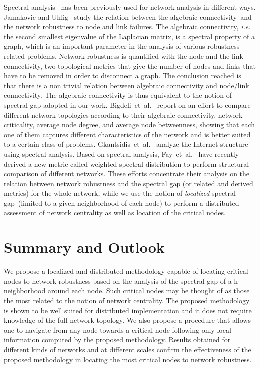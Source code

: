 \documentclass[conference,fleqn]{IEEEtran}
\begin{document}
Spectral analysis~\cite{Chung1997} has been previously used for network analysis in different ways.
Jamakovic and Uhlig~\cite{Jamakovic2007a} study the relation between the algebraic connectivity~\cite{Fiedler1973}and the network robustness to node and link failures.
The algebraic connectivity, \textit{i.e.} the second smallest eigenvalue of the Laplacian 
matrix, is a spectral property of a graph, which is an important parameter in the analysis of various robustness-related problems. Network robustness is quantified with the node and the link connectivity, two topological metrics that give the number of nodes and links 
that have to be removed in order to disconnect a graph.
The conclusion reached is that there is a non trivial relation between algebraic connectivity and node/link connectivity.
The algebraic connectivity is thus equivalent to the notion of spectral gap adopted in our work. Bigdeli~et~al.~\cite{Bigdeli2009} report on an effort to compare different network topologies according to their algebraic connectivity, network 
criticality, average node degree, and average node betweenness, showing that each one of them captures different characteristics of the 
network and is better suited to a certain class of problems. Gkantsidis~et~al.~\cite{Gkantsidis2003} analyze
the Internet structure using spectral analysis. Based on spectral analysis, Fay~et~al.~\cite{Fay2010} have recently derived a new metric called 
weighted spectral distribution to perform structural comparison of different networks. 
These efforts concentrate their analysis on the relation between network robustness and the spectral gap (or related and derived metrics) for the whole network, while we use the notion of \emph{localized} spectral gap~(limited to a given neighborhood of each node) to perform
a distributed assessment of network centrality as well as location of the critical nodes.

\section{Summary and Outlook}
\label{sec:Conc}

We propose a localized and distributed methodology capable of locating critical nodes 
to network robustness based on the analysis of the spectral gap of a h-neighborhood
around each node. Such critical nodes may be thought of as those the most related to the notion of network centrality.
The proposed methodology is shown to be well suited
for distributed implementation and it does not require knowledge of the full network
topology. We also propose a procedure that allows one to
navigate from any node towards a critical node following
only local information computed by the proposed methodology.
Results obtained for different kinds of networks and at different scales
confirm the effectiveness of the proposed methodology in
locating the most critical nodes to network robustness.
\end{document}
